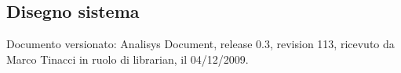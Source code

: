 \subsection{Disegno sistema}
Documento versionato: Analisys Document, release 0.3, revision 113, ricevuto da
Marco Tinacci in ruolo di librarian, il 04/12/2009.